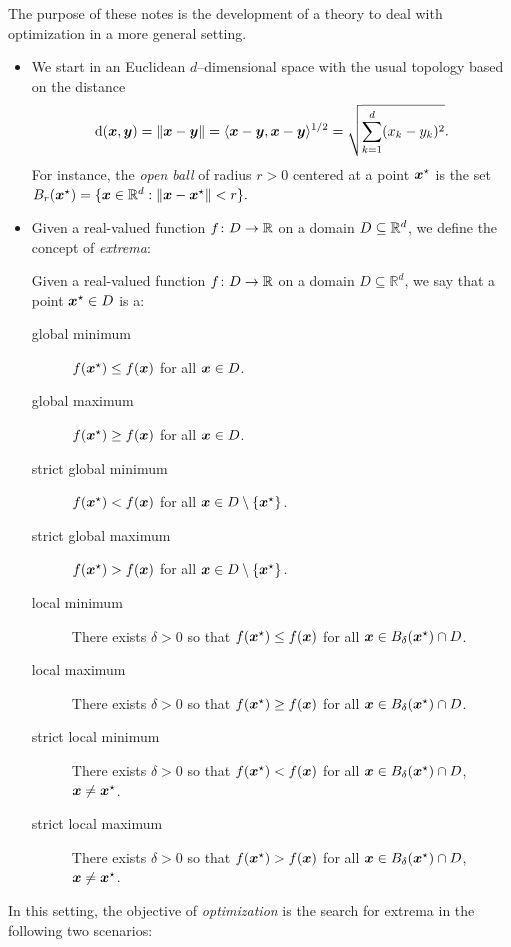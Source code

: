 The purpose of these notes is the development of a theory to deal with optimization in a more general setting.
\begin{itemize}
	\item We start in an Euclidean $d$--dimensional space with the usual topology based on the distance 
	\begin{equation*}
	\operatorname{d}(\boldsymbol{x},\boldsymbol{y})=\lVert \boldsymbol{x}-\boldsymbol{y} \rVert = \langle \boldsymbol{x}-\boldsymbol{y}, \boldsymbol{x}-\boldsymbol{y} \rangle^{1/2} = \sqrt{\sum_{k=1}^d (x_k-y_k)^2 }.
	\end{equation*}
	For instance, the \emph{open ball} of radius $r>0$ centered at a point $\boldsymbol{x}^{\star}$ is the set $B_r(\boldsymbol{x}^{\star}) = \{ \boldsymbol{x} \in \mathbb{R}^d : \lVert \boldsymbol{x}-\boldsymbol{x}^{\star} \rVert< r \}.$
	\item Given a real-valued function $f\colon D \to \mathbb{R}$ on a domain $D \subseteq \mathbb{R}^d$, we define the concept of \emph{extrema}:
	\begin{definition}\label{def:extrema}
	Given a real-valued function $f\colon D \to \mathbb{R}$ on a domain $D \subseteq \mathbb{R}^d$, we say that a point $\boldsymbol{x}^{\star} \in D$ is a:
	\begin{description}
		\item [global minimum] $f(\boldsymbol{x}^{\star}) \leq f(\boldsymbol{x})$ for all $\boldsymbol{x} \in D$.
		\item [global maximum] $f(\boldsymbol{x}^{\star}) \geq f(\boldsymbol{x})$ for all $\boldsymbol{x} \in D$.
		\item [strict global minimum] $f(\boldsymbol{x}^{\star}) < f(\boldsymbol{x})$ for all $\boldsymbol{x} \in D \setminus \{ \boldsymbol{x}^{\star} \}$.
		\item [strict global maximum] $f(\boldsymbol{x}^{\star}) > f(\boldsymbol{x})$ for all $\boldsymbol{x} \in D \setminus \{ \boldsymbol{x}^{\star} \}$.
		\item [local minimum] There exists $\delta>0$ so that  $f(\boldsymbol{x}^{\star}) \leq f(\boldsymbol{x})$ for all $\boldsymbol{x} \in B_\delta(\boldsymbol{x}^{\star})\cap D$.
		\item [local maximum] There exists $\delta>0$ so that  $f(\boldsymbol{x}^{\star}) \geq f(\boldsymbol{x})$ for all $\boldsymbol{x} \in B_\delta(\boldsymbol{x}^{\star})\cap D$.
		\item [strict local minimum] There exists $\delta>0$ so that  $f(\boldsymbol{x}^{\star}) < f(\boldsymbol{x})$ for all $\boldsymbol{x} \in B_\delta(\boldsymbol{x}^{\star})\cap D$, $\boldsymbol{x} \neq \boldsymbol{x}^{\star}$.
		\item [strict local maximum] There exists $\delta>0$ so that  $f(\boldsymbol{x}^{\star}) > f(\boldsymbol{x})$ for all $\boldsymbol{x} \in B_\delta(\boldsymbol{x}^{\star})\cap D$, $\boldsymbol{x} \neq \boldsymbol{x}^{\star}$.
	\end{description}
	\end{definition}	
\end{itemize}
In this setting, the objective of \emph{optimization} is the search for extrema in the following two scenarios:
